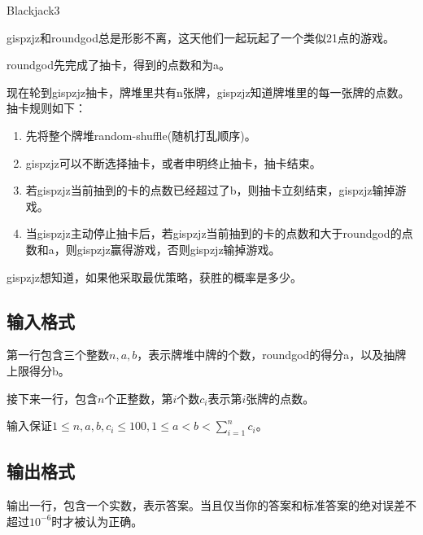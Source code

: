 \begin{Problem}{Blackjack}{3}

gispzjz和roundgod总是形影不离，这天他们一起玩起了一个类似21点的游戏。

roundgod先完成了抽卡，得到的点数和为a。

现在轮到gispzjz抽卡，牌堆里共有n张牌，gispzjz知道牌堆里的每一张牌的点数。抽卡规则如下：

\begin{enumerate}
\item 先将整个牌堆random-shuffle(随机打乱顺序)。
\item gispzjz可以不断选择抽卡，或者申明终止抽卡，抽卡结束。
\item 若gispzjz当前抽到的卡的点数已经超过了b，则抽卡立刻结束，gispzjz输掉游戏。
\item 当gispzjz主动停止抽卡后，若gispzjz当前抽到的卡的点数和大于roundgod的点数和a，则gispzjz赢得游戏，否则gispzjz输掉游戏。
\end{enumerate}

gispzjz想知道，如果他采取最优策略，获胜的概率是多少。

\subsection*{输入格式}

第一行包含三个整数$n,a,b$，表示牌堆中牌的个数，roundgod的得分a，以及抽牌上限得分b。

接下来一行，包含$n$个正整数，第$i$个数$c_i$表示第$i$张牌的点数。

输入保证$1 \leq n,a,b,c_i \leq 100, 1 \leq a < b < \sum_{i=1}^n c_i$。

\subsection*{输出格式}

输出一行，包含一个实数，表示答案。当且仅当你的答案和标准答案的绝对误差不超过$10^{-6}$时才被认为正确。


\end{Problem}
